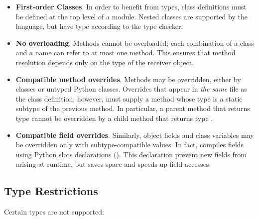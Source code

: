 \documentclass[a4paper,english,cleveref,autoref,thm-restate,anonymous,]{lipics-v2021}
\begin{document}
\begin{itemize}
  \item \textbf{First-order Classes}.
    In order to benefit from types, class definitions must be defined at the top level of a module.
    Nested classes are supported by the language, but have type  according
    to the type checker.

  \item \textbf{No overloading}.
    Methods cannot be overloaded; each combination of a class
    and a name can refer to at most one method.
    This ensures that method resolution depends only on the
    type of the receiver object.


  \item \textbf{Compatible method overrides}.
    Methods may be overridden, either by \SP{} classes or
    untyped Python classes.
    Overrides that appear in \emph{the same} \SP{} file as the class definition, however,
    must supply a method whose type is a static subtype of the previous method.
    In particular, a parent method that returns type  cannot be
    overridden by a child method that returns type .


  \item \textbf{Compatible field overrides}.
    Similarly, object fields and class variables may be overridden
    only with subtype-compatible values.
    In fact, \SP{} compiles fields using Python slots
    declarations ().
    This declaration prevent new fields from arising at runtime,
    but saves space and speeds up field accesses.


\end{itemize}


\subsection{Type Restrictions}

Certain types are not supported:
\end{document}
